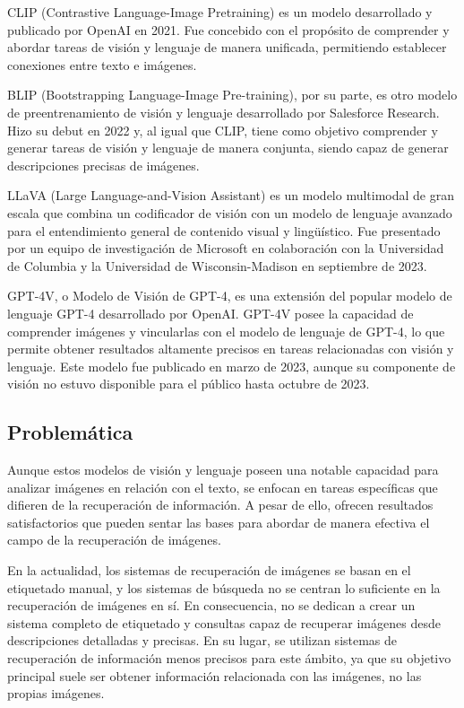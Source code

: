 CLIP (Contrastive Language-Image Pretraining) es un modelo desarrollado y publicado por OpenAI en 2021. Fue concebido con el prop\'osito de comprender y abordar tareas de visi\'on y lenguaje de manera unificada, permitiendo establecer conexiones entre texto e im\'agenes.

BLIP (Bootstrapping Language-Image Pre-training), por su parte, es otro modelo de preentrenamiento de visi\'on y lenguaje desarrollado por Salesforce Research. Hizo su debut en 2022 y, al igual que CLIP, tiene como objetivo comprender y generar tareas de visi\'on y lenguaje de manera conjunta, siendo capaz de generar descripciones precisas de im\'agenes.

LLaVA (Large Language-and-Vision Assistant) es un modelo multimodal de gran escala que combina un codificador de visi\'on con un modelo de lenguaje avanzado para el entendimiento general de contenido visual y lingü\'istico. Fue presentado por un equipo de investigaci\'on de Microsoft en colaboraci\'on con la Universidad de Columbia y la Universidad de Wisconsin-Madison en septiembre de 2023.

GPT-4V, o Modelo de Visi\'on de GPT-4, es una extensi\'on del popular modelo de lenguaje GPT-4 desarrollado por OpenAI. GPT-4V posee la capacidad de comprender im\'agenes y vincularlas con el modelo de lenguaje de GPT-4, lo que permite obtener resultados altamente precisos en tareas relacionadas con visi\'on y lenguaje. Este modelo fue publicado en marzo de 2023, aunque su componente de visi\'on no estuvo disponible para el p\'ublico hasta octubre de 2023.

\subsection*{Problem\'atica}
Aunque estos modelos de visi\'on y lenguaje poseen una notable capacidad para analizar im\'agenes en relaci\'on con el texto, se enfocan en tareas espec\'ificas que difieren de la recuperaci\'on de informaci\'on. A pesar de ello, ofrecen resultados satisfactorios que pueden sentar las bases para abordar de manera efectiva el campo de la recuperaci\'on de im\'agenes.

En la actualidad, los sistemas de recuperaci\'on de im\'agenes se basan en el etiquetado manual, y los sistemas de b\'usqueda no se centran lo suficiente en la recuperaci\'on de im\'agenes en s\'i. En consecuencia, no se dedican a crear un sistema completo de etiquetado y consultas capaz de recuperar im\'agenes desde descripciones detalladas y precisas. En su lugar, se utilizan sistemas de recuperaci\'on de informaci\'on menos precisos para este \'ambito, ya que su objetivo principal suele ser obtener informaci\'on relacionada con las im\'agenes, no las propias im\'agenes.

